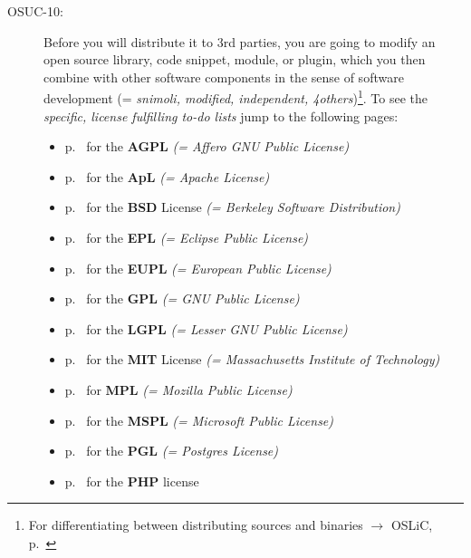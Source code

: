\begin{description}
\item[OSUC-10:]\label{OSUC-10-DEF} Before you will distribute it to 3rd parties,
you are going to modify an open source library, code snippet, module, or plugin,
which you then combine with other software components in the sense of software
development (= \textit{snimoli, modified, independent, 4others})\footnote{For
differentiating between distributing sources and binaries $\rightarrow$ OSLiC,
p.\ \pageref{sec:SourceBinaryDifference}}. To see the \textit{specific, license
fulfilling to-do lists} jump to the following pages:
  \begin{itemize}
    \item p.\ \pageref{OSUC-10-AGPL} for the \textbf{AGPL}
      \textit{(= Affero GNU Public License)} 
    \item p.\ \pageref{OSUC-10-Apache20} for the \textbf{ApL}
      \textit{(= Apache License)}
    \item p.\ \pageref{OSUC-10-BSD} for the \textbf{BSD} License
      \textit{(= Berkeley Software Distribution)}
    \item p.\ \pageref{OSUC-10-EPL} for the \textbf{EPL}
      \textit{(= Eclipse Public License)}     
    \item p.\ \pageref{OSUC-10-EUPL} for the \textbf{EUPL}
      \textit{(= European Public License)} 
    \item p.\ \pageref{OSUC-10-GPL} for the \textbf{GPL}
       \textit{(= GNU Public License)} 
    \item p.\ \pageref{OSUC-10-LGPL} for the \textbf{LGPL}
      \textit{(= Lesser GNU Public License)}           
    \item p.\ \pageref{OSUC-10-MIT} for the \textbf{MIT} License
       \textit{(= Massachusetts Institute of Technology)} 
    \item p.\ \pageref{OSUC-10-MPL} for \textbf{MPL}
      \textit{(= Mozilla Public License)}     
    \item p.\ \pageref{OSUC-10-MsPL} for the \textbf{MSPL}
      \textit{(= Microsoft Public License)} 
    \item p.\ \pageref{OSUC-10-PGL} for the \textbf{PGL}
      \textit{(= Postgres License)} 
    \item p.\ \pageref{OSUC-10-PHP} for the \textbf{PHP} license 
  \end{itemize}

\end{description}

%
